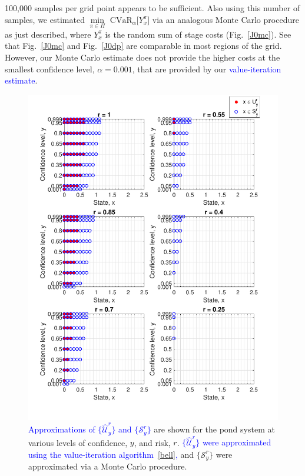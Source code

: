 \documentclass[letterpaper, 10 pt, conference]{ieeeconf}  %
\begin{document}
100,000 samples per grid point appears to be sufficient. 
Also using this number of samples, we estimated ${\underset{\pi \in \Pi}\min}\text{ CVaR}_\alpha \big[ Y_x^{\pi} \big]$ via an analogous Monte Carlo
procedure as just described, where $Y_x^\pi$ is the random sum of stage costs (Fig.~\ref{J0mc}).\footnotemark
{}
See that Fig.~\ref{J0mc} and Fig.~\ref{J0dp} are comparable in most regions of the grid. 
However, our Monte Carlo estimate does not provide the higher costs at the smallest confidence level, $\alpha = 0.001$,
that are provided by our \textcolor{blue}{value-iteration estimate}.   

\begin{figure}[thpb]
      \centering
      \includegraphics[scale=0.5]{output_CompareScript_Sept112018.pdf}
      \caption{ \textcolor{blue}{Approximations of $\{\widehat{\mathcal{U}}_y^r\}$ and $\{\mathcal{S}_y^r\}$} are shown for the pond system at various levels of confidence, $y$, and risk, $r$.
	  \textcolor{blue}{$\{\widehat{\mathcal{U}}_y^r\}$ were approximated using the value-iteration algorithm~\eqref{bell},} and $\{\mathcal{S}_y^r\}$ were approximated via a Monte Carlo procedure.} 
      \label{compare}
\end{figure}
\end{document}
